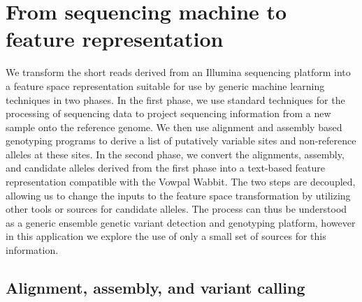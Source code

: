 \documentclass{article}
\begin{document}







\section{From sequencing machine to feature representation}

We transform the short reads derived from an Illumina sequencing platform into a feature space representation suitable for use by generic machine learning techniques in two phases.
In the first phase, we use standard techniques for the processing of sequencing data to project sequencing information from a new sample onto the reference genome.
We then use alignment and assembly based genotyping programs to derive a list of putatively variable sites and non-reference alleles at these sites.
In the second phase, we convert the alignments, assembly, and candidate alleles derived from the first phase into a text-based feature representation compatible with the Vowpal Wabbit.
The two steps are decoupled, allowing us to change the inputs to the feature space transformation by utilizing other tools or sources for candidate alleles.
The process can thus be understood as a generic ensemble genetic variant detection and genotyping platform, however in this application we explore the use of only a small set of sources for this information.

\subsection{Alignment, assembly, and variant calling}
\end{document}
